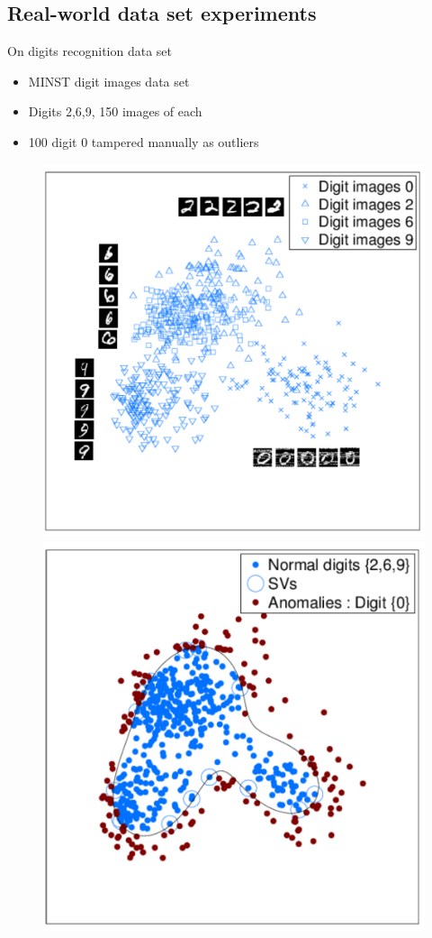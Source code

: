 \subsection{Real-world data set experiments}
\begin{frame}{On digits recognition data set}
\begin{itemize}
\item MINST digit images data set
\item Digits {2,6,9}, 150 images of each
\item 100 digit {0} tampered manually as outliers
\end{itemize}
\begin{figure}
\centering
\includegraphics[scale=0.198]{imgs/real_01_01.pdf}
\includegraphics[scale=0.2]{imgs/real_01_02.pdf}

\end{figure}
\end{frame}
